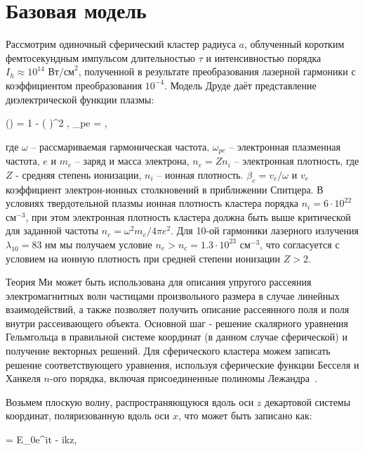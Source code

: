 \section{Базовая модель}

Рассмотрим одиночный сферический кластер радиуса $a$, облученный коротким фемтосекундным импульсом длительностью $\tau$ и интенсивностью порядка $I_{h} \approx 10^{14}$ $\textrm{Вт/см}^2$, полученной в результате преобразования лазерной гармоники с коэффициентом преобразования $10^{-4}$. Модель Друде даёт представление диэлектрической функции плазмы:

    \eq
		\varepsilon (\w) = 1 - \left(  \right)^2 , \qquad \w_{pe} = ,
		\label{eps_plasma}
	\qe

\noindent где $\omega$ -- рассмариваемая гармоническая частота, $\omega_{pe}$ -- электронная плазменная частота, $e$ и $m_e$ -- заряд и масса электрона, $n_e = Z n_i$ -- электронная плотность, где $Z$ - средняя степень ионизации, $n_i$ -- ионная плотность. $\beta_{e} = v_e / \omega$ и $v_e$ коэффициент электрон-ионных столкновений в приближении Спитцера. В условиях твердотельной плазмы ионная плотность кластера порядка $n_i = 6 \cdot 10^{22}$ $\textrm{см}^{-3}$, при этом электронная плотность кластера должна быть выше критической для заданной частоты $n_c = \omega^2 m_e / 4 \pi e^2$. Для 10-ой гармоники лазерного излучения $\lambda_{10} = 83$ нм мы получаем условие $n_e > n_c = 1.3 \cdot 10^{23}$ $\textrm{см}^{-3}$, что согласуется с условием на ионную плотность при средней степени ионизации $Z > 2$.

Теория Ми может быть использована для описания упругого рассеяния электромагнитных волн частицами произвольного размера в случае линейных взаимодействий, а также позволяет получить описание рассеянного поля и поля внутри рассеивающего объекта. Основной шаг - решение скалярного уравнения Гельмгольца в правильной системе координат (в данном случае сферической) и получение векторных решений. Для сферического кластера можем записать решение соответствующего уравнения, используя сферические функции Бесселя и Ханкеля $n$-ого порядка, включая присоединенные полиномы Лежандра~\cite{boren_huffman}.

Возьмем плоскую волну, распространяющуюся вдоль оси $z$ декартовой системы координат, поляризованную вдоль оси $x$, что может быть записано как:

    \eq
         = E_0\:e^{i\w t - ikz}\:,
        \label{E_i_sph}
    \qe

